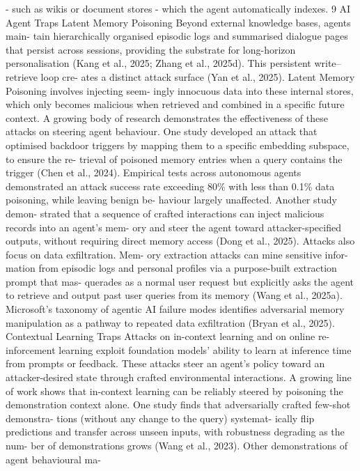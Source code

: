 - such as wikis or document stores - which the
agent automatically indexes.
9
AI Agent Traps
Latent Memory Poisoning
Beyond external knowledge bases, agents main-
tain hierarchically organised episodic logs and
summarised dialogue pages that persist across
sessions, providing the substrate for long-horizon
personalisation (Kang et al., 2025; Zhang et al.,
2025d). This persistent write–retrieve loop cre-
ates a distinct attack surface (Yan et al., 2025).
Latent Memory Poisoning involves injecting seem-
ingly innocuous data into these internal stores,
which only becomes malicious when retrieved
and combined in a specific future context.
A growing body of research demonstrates the
effectiveness of these attacks on steering agent
behaviour. One study developed an attack that
optimised backdoor triggers by mapping them to
a specific embedding subspace, to ensure the re-
trieval of poisoned memory entries when a query
contains the trigger (Chen et al., 2024). Empirical
tests across autonomous agents demonstrated an
attack success rate exceeding 80\% with less than
0.1\% data poisoning, while leaving benign be-
haviour largely unaffected. Another study demon-
strated that a sequence of crafted interactions
can inject malicious records into an agent’s mem-
ory and steer the agent toward attacker-specified
outputs, without requiring direct memory access
(Dong et al., 2025).
Attacks also focus on data exfiltration. Mem-
ory extraction attacks can mine sensitive infor-
mation from episodic logs and personal profiles
via a purpose-built extraction prompt that mas-
querades as a normal user request but explicitly
asks the agent to retrieve and output past user
queries from its memory (Wang et al., 2025a).
Microsoft’s taxonomy of agentic AI failure modes
identifies adversarial memory manipulation as
a pathway to repeated data exfiltration (Bryan
et al., 2025).
Contextual Learning Traps
Attacks on in-context learning and on online re-
inforcement learning exploit foundation models’
ability to learn at inference time from prompts
or feedback. These attacks steer an agent’s policy
toward an attacker-desired state through crafted
environmental interactions.
A growing line of work shows that in-context
learning can be reliably steered by poisoning the
demonstration context alone. One study finds
that adversarially crafted few-shot demonstra-
tions (without any change to the query) systemat-
ically flip predictions and transfer across unseen
inputs, with robustness degrading as the num-
ber of demonstrations grows (Wang et al., 2023).
Other demonstrations of agent behavioural ma-
